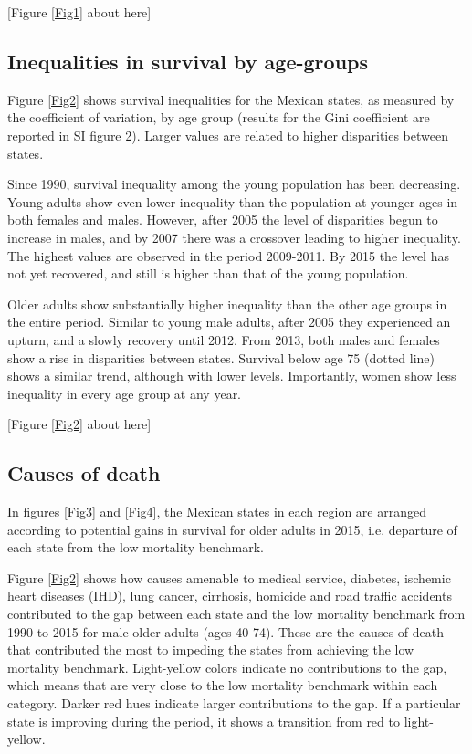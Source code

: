 \documentclass{bmcart}
\begin{document}
\begin{center}
[Figure \ref{Fig1} about here]
\end{center}


\subsection*{Inequalities in survival by age-groups}
Figure \ref{Fig2} shows survival inequalities for the Mexican states, as measured by the coefficient of variation, by age group (results for the Gini coefficient are reported in SI figure 2). Larger values are related to higher disparities between states. 


Since 1990, survival inequality among the young population has been decreasing. Young adults show even lower inequality than the population at younger ages in both females and males. However, after 2005 the level of disparities begun to increase in males, and by 2007 there was a crossover leading to higher inequality. The highest values are observed in the period 2009-2011. By 2015 the level has not yet recovered, and still is higher than that of the young population.

Older adults show substantially higher inequality than the other age groups in the entire period. Similar to young male adults, after 2005 they experienced an upturn, and a slowly recovery until 2012. From 2013, both males and females show a rise in disparities between states. Survival below age 75 (dotted line) shows a similar trend, although with lower levels. Importantly, women show less inequality in every age group at any year.\\

\begin{center}
[Figure \ref{Fig2} about here]
\end{center}


\subsection*{Causes of death}


In figures \ref{Fig3} and \ref{Fig4}, the Mexican states in each region are arranged according to potential gains in survival for older adults in 2015, i.e. departure of each state from the low mortality benchmark. 

Figure \ref{Fig2} shows how causes amenable to medical service, diabetes, ischemic heart diseases (IHD), lung cancer, cirrhosis, homicide and road traffic accidents contributed to the gap between each state and the low mortality benchmark from 1990 to 2015 for male older adults (ages 40-74). These are the causes of death that contributed the most to impeding the states from achieving the low mortality benchmark. Light-yellow colors indicate no contributions to the gap, which means that are very close to the low mortality benchmark within each category. Darker red hues indicate larger contributions to the gap. If a particular state is improving during the period, it shows a transition from red to light-yellow. 
\end{document}
